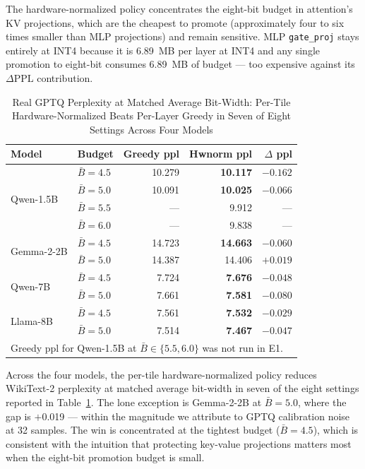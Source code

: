 \documentclass{ieeeaccess}
\begin{document}
The hardware-normalized policy concentrates the eight-bit budget in
attention's KV projections, which are the cheapest to promote
(approximately four to six times smaller than MLP projections) and
remain sensitive. MLP \texttt{gate\_proj} stays entirely at INT4
because it is 6.89~MB per layer at INT4 and any single promotion to
eight-bit consumes 6.89~MB of budget --- too expensive against its
$\Delta\mathrm{PPL}$ contribution.

\begin{table}[t]
\caption{Real GPTQ Perplexity at Matched Average Bit-Width: Per-Tile Hardware-Normalized Beats Per-Layer Greedy in Seven of Eight Settings Across Four Models}
\label{tab:hwnorm_ppl}
\centering
\small
\begin{tabular}{llrrr}
\toprule
Model & Budget & Greedy ppl & Hwnorm ppl & $\Delta$ ppl \\
\midrule
\multirow{4}{*}{Qwen-1.5B}  & $\bar B = 4.5$ & 10.279 & \textbf{10.117} & $-0.162$ \\
                            & $\bar B = 5.0$ & 10.091 & \textbf{10.025} & $-0.066$ \\
                            & $\bar B = 5.5$ & ---    & 9.912           & ---      \\
                            & $\bar B = 6.0$ & ---    & 9.838           & ---      \\
\midrule
\multirow{2}{*}{Gemma-2-2B} & $\bar B = 4.5$ & 14.723 & \textbf{14.663} & $-0.060$ \\
                            & $\bar B = 5.0$ & 14.387 & 14.406          & $+0.019$ \\
\midrule
\multirow{2}{*}{Qwen-7B}    & $\bar B = 4.5$ & 7.724  & \textbf{7.676}  & $-0.048$ \\
                            & $\bar B = 5.0$ & 7.661  & \textbf{7.581}  & $-0.080$ \\
\midrule
\multirow{2}{*}{Llama-8B}   & $\bar B = 4.5$ & 7.561  & \textbf{7.532}  & $-0.029$ \\
                            & $\bar B = 5.0$ & 7.514  & \textbf{7.467}  & $-0.047$ \\
\bottomrule
\multicolumn{5}{l}{\footnotesize Greedy ppl for Qwen-1.5B at $\bar B \in \{5.5, 6.0\}$ was not run in E1.}
\end{tabular}
\end{table}

Across the four models, the per-tile hardware-normalized policy
reduces WikiText-2 perplexity at matched average bit-width in seven of
the eight settings reported in Table~\ref{tab:hwnorm_ppl}. The lone
exception is Gemma-2-2B at $\bar B\!=\!5.0$, where the gap is $+$0.019
--- within the magnitude we attribute to GPTQ calibration noise at 32
samples. The win is concentrated at the tightest budget ($\bar B\!=\!4.5$),
which is consistent with the intuition that protecting key-value
projections matters most when the eight-bit promotion budget is small.
\end{document}
